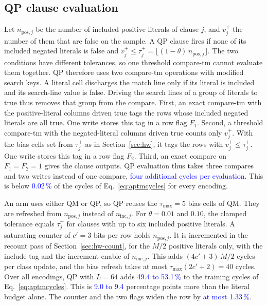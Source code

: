 \documentclass[preprint,12pt,times]{elsarticle}
\newcommand{\proj}[1]{\textcolor{blue}{#1}}
\newcommand{\add}[1]{{\color{blue}#1}}
\newcommand{\ninc}{n_{\mathrm{inc},j}}
\begin{document}
\add{\subsection{QP clause evaluation}
\label{sec:hw-qp}
Let $n_{\mathrm{pos},j}$ be the number of included positive literals of clause $j$, and $v_j^{+}$ the number of them that are false on the sample.
A QP clause fires if none of its included negated literals is false and $v_j^{+} \le \tau_j^{+} = \lfloor (1-\theta)\,n_{\mathrm{pos},j} \rfloor$.
The two conditions have different tolerances, so one threshold compare-tm cannot evaluate them together.
QP therefore uses two compare-tm operations with modified search keys.
A literal cell discharges the match line only if its literal is included and its search-line value is false.
Driving the search lines of a group of literals to true thus removes that group from the compare.
First, an exact compare-tm with the positive-literal columns driven true tags the rows whose included negated literals are all true.
One write stores this tag in a row flag $F_1$.
Second, a threshold compare-tm with the negated-literal columns driven true counts only $v_j^{+}$.
With the bias cells set from $\tau_j^{+}$ as in Section~\ref{sec:hw}, it tags the rows with $v_j^{+} \le \tau_j^{+}$.
One write stores this tag in a row flag $F_2$.
Third, an exact compare on $F_1 = F_2 = 1$ gives the clause outputs.
QP evaluation thus takes three compares and two writes instead of one compare, \proj{four additional cycles per evaluation}.
This is below \proj{0.02\,\%} of the cycles of Eq.~\eqref{eq:aptmcycles} for every encoding.

An arm uses either QM or QP, so QP reuses the $\tau_{\max} = 5$ bias cells of QM.
They are refreshed from $n_{\mathrm{pos},j}$ instead of $\ninc$.
For $\theta = 0.01$ and $0.10$, the clamped tolerance equals $\tau_j^{+}$ for clauses with up to six included positive literals.
A saturating counter of $c' = 3$ bits per row holds $n_{\mathrm{pos},j}$.
It is incremented in the recount pass of Section~\ref{sec:hw-count}, for the $M/2$ positive literals only, with the include tag and the increment enable of $\ninc$.
This adds $(4c'+3)\,M/2$ cycles per class update, and the bias refresh takes at most $\tau_{\max}(2c'+2) = 40$ cycles.
Over all encodings, QP with $L = 64$ adds \proj{49.4 to 53.1\,\%} to the training cycles of Eq.~\eqref{eq:aptmcycles}.
This is \proj{9.0 to 9.4} percentage points more than the literal budget alone.
The counter and the two flags widen the row by \proj{at most 1.33\,\%}.}
\end{document}
